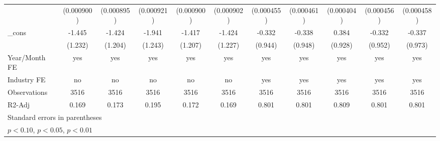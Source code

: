 \begin{table}[htbp]
\begin{tabular}{l*{10}{c}}
                &(0.000900)         &(0.000895)         &(0.000921)         &(0.000900)         &(0.000902)         &(0.000455)         &(0.000461)         &(0.000404)         &(0.000456)         &(0.000458)         \\
\_cons          &   -1.445         &   -1.424         &   -1.941         &   -1.417         &   -1.424         &   -0.332         &   -0.338         &    0.384         &   -0.332         &   -0.337         \\
                &  (1.232)         &  (1.204)         &  (1.243)         &  (1.207)         &  (1.227)         &  (0.944)         &  (0.948)         &  (0.928)         &  (0.952)         &  (0.973)         \\
\hline
Year/Month FE   &      yes         &      yes         &      yes         &      yes         &      yes         &      yes         &      yes         &      yes         &      yes         &      yes         \\
Industry FE     &       no         &       no         &       no         &       no         &       no         &      yes         &      yes         &      yes         &      yes         &      yes         \\
Observations    &     3516         &     3516         &     3516         &     3516         &     3516         &     3516         &     3516         &     3516         &     3516         &     3516         \\
R2-Adj          &    0.169         &    0.173         &    0.195         &    0.172         &    0.169         &    0.801         &    0.801         &    0.809         &    0.801         &    0.801         \\
\hline\hline
\multicolumn{11}{l}{\footnotesize Standard errors in parentheses}\\
\multicolumn{11}{l}{\footnotesize \sym{*} \(p<0.10\), \sym{**} \(p<0.05\), \sym{***} \(p<0.01\)}\\
\end{tabular}
\end{table}
